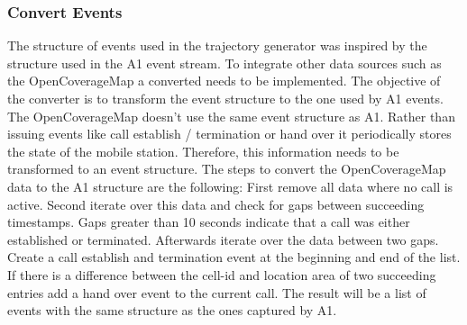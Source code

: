 \documentclass[master,english]{hgbthesis}
\begin{document}
\subsubsection{Convert Events}
The structure of events used in the trajectory generator was inspired by the structure used in the A1 event stream. To integrate other data sources such as the OpenCoverageMap a converted needs to be implemented. The objective of the converter is to transform the event structure to the one used by A1 events.
The OpenCoverageMap doesn't use the same event structure as A1. Rather than issuing events like call establish / termination or hand over it periodically stores the state of the mobile station. Therefore, this information needs to be transformed to an event structure. The steps to convert the OpenCoverageMap data to the A1 structure are the following: First remove all data where no call is active. Second iterate over this data and check for gaps between succeeding timestamps. Gaps greater than 10 seconds indicate that a call was either established or terminated. Afterwards iterate over the data between two gaps. Create a call establish and termination event at the beginning and end of the list. If there is a difference between the cell-id and location area of two succeeding entries add a hand over event to the current call. The result will be a  list of events with the same structure as the ones captured by A1.
\end{document}
